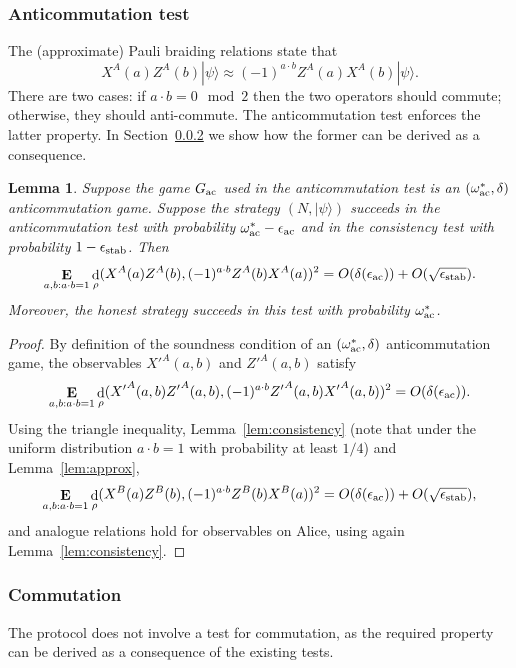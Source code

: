 \documentclass[11pt,letterpaper]{article}
\newcommand{\<}{\langle}
\renewcommand{\>}{\rangle}
\newtheorem{lemma}[theorem]{Lemma}
\newcommand{\ket}[1]{| #1 \>}
\newcommand{\eps}{\epsilon}
\DeclareMathOperator{\E}{\mathbf{E}}
\DeclareMathOperator{\DIS}{d}
\DeclareMathOperator{\Drho}{\DIS_\rho}
\newcommand{\wg}{\omega^*_{\ensuremath{\rm ac}}}
\newcommand{\ac}{{\ensuremath{\rm ac}}}
\newcommand{\stab}{\ensuremath{\rm stab}}
\begin{document}
\subsubsection{Anticommutation test}

The (approximate) Pauli braiding relations state that 
$$X^A(a){Z^A}(b)\ket{\psi}
\approx (-1)^{a \cdot b} {Z^A}(a)X^A(b) \ket{\psi}.$$
There are two cases: if $a\cdot b = 0 \mod 2$ then the two operators should commute;
otherwise, they should anti-commute. The anticommutation test enforces the latter property. In Section~\ref{sec:commutation} we show how the former can be derived as a consequence. 



\begin{lemma}\label{lem:anti-commute}
Suppose the game $G_\ac$ used in the anticommutation test is an $(\wg,\delta)$ anticommutation game. Suppose the strategy $(N,\ket{\psi})$ succeeds in the
anticommutation test with probability $\wg-\eps_\ac$ and in
the consistency test with probability $1 - \eps_{\stab}$. Then  
$$\E_{a, b : a\cdot b = 1} \Drho( X^A(a){Z^A}(b),
(-1)^{a \cdot b} {Z^A}(b)X^A(a) )^2 = O(\delta(\eps_\ac)) + O(\sqrt{\eps_{\stab}}).$$
Moreover, the honest strategy succeeds in this test with
probability $\wg$.
\end{lemma}

\begin{proof}
By definition of the soundness condition of an $(\wg,\delta)$ anticommutation game, the observables ${X'}^A(a,b)$ and ${Z'}^A(a,b)$ satisfy 
$$\E_{a, b : a\cdot b = 1} \DIS_\rho( {X'}^A(a,b){{Z'}^A}(a,b),
(-1)^{a \cdot b} {{Z'}^A}(a,b){X'}^A(a,b) )^2 = O(\delta(\eps_\ac)).$$
Using the triangle inequality, Lemma~\ref{lem:consistency} (note that under the uniform distribution $a\cdot b=1$ with probability at least $1/4$) and Lemma~\ref{lem:approx}, 
$$\E_{a, b : a\cdot b = 1} \DIS_\rho( {X}^B(a){{Z}^B}(b),
(-1)^{a \cdot b} {{Z}^B}(b){X}^B(a) )^2 = O(\delta(\eps_\ac)) + O(\sqrt{\eps_{\stab}}),$$
and analogue relations hold for observables on Alice, using again Lemma~\ref{lem:consistency}. 
\end{proof}


\subsubsection{Commutation}\label{sec:commutation}
The protocol does not involve a test for commutation, as the required property can be derived as a consequence of the existing tests. 
\end{document}
